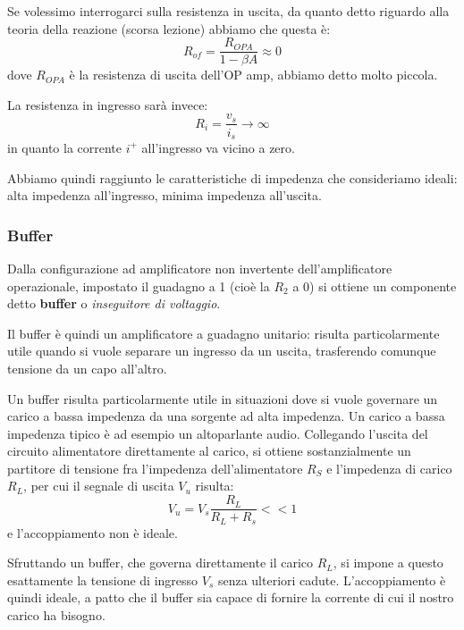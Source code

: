 \documentclass[a4paper,11pt]{article}
\begin{document}
Se volessimo interrogarci sulla resistenza in uscita, da quanto detto riguardo alla teoria della reazione (scorsa lezione) abbiamo che questa è:
$$
R_{of} = \frac{R_{OPA}}{1 - \beta A} \approx 0
$$
dove $R_{OPA}$ è la resistenza di uscita dell'OP amp, abbiamo detto molto piccola.

La resistenza in ingresso sarà invece:
$$
R_i = \frac{v_s}{i_s} \rightarrow \infty
$$
in quanto la corrente $i^+$ all'ingresso va vicino a zero.

Abbiamo quindi raggiunto le caratteristiche di impedenza che consideriamo ideali: alta impedenza all'ingresso, minima impedenza all'uscita.

\subsubsection{Buffer}
Dalla configurazione ad amplificatore non invertente dell'amplificatore operazionale, impostato il guadagno a 1 (cioè la $R_2$ a 0) si ottiene un componente detto \textbf{buffer} o \textit{inseguitore di voltaggio}.
\begin{center}
\end{center}

Il buffer è quindi un amplificatore a guadagno unitario: risulta particolarmente utile quando si vuole separare un ingresso da un uscita, trasferendo comunque tensione da un capo all'altro.

Un buffer risulta particolarmente utile in situazioni dove si vuole governare un carico a bassa impedenza da una sorgente ad alta impedenza. Un carico a bassa impedenza tipico è ad esempio un altoparlante audio. Collegando l'uscita del circuito alimentatore direttamente al carico, si ottiene sostanzialmente un partitore di tensione fra l'impedenza dell'alimentatore $R_S$ e l'impedenza di carico $R_L$, per cui il segnale di uscita $V_u$ risulta:
$$
V_u = V_s \frac{R_L}{R_L + R_s} << 1
$$
e l'accoppiamento non è ideale.

Sfruttando un buffer, che governa direttamente il carico $R_L$, si impone a questo esattamente la tensione di ingresso $V_s$ senza ulteriori cadute. L'accoppiamento è quindi ideale, a patto che il buffer sia capace di fornire la corrente di cui il nostro carico ha bisogno.
\end{document}
